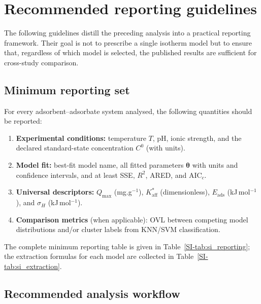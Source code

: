 \documentclass[journal=jacsat,manuscript=article]{achemso}
\begin{document}
	\section{Recommended reporting guidelines}
	\label{sec:guidelines}

	The following guidelines distill the preceding analysis into a practical reporting framework. Their goal is not to prescribe a single isotherm model but to ensure that, regardless of which model is selected, the published results are sufficient for cross-study comparison.

	\subsection{Minimum reporting set}
	\label{sec:min_reporting}

	For every adsorbent--adsorbate system analysed, the following quantities should be reported:
	\begin{enumerate}
		\item \textbf{Experimental conditions:} temperature $T$, pH, ionic strength, and the declared standard-state concentration $C^{0}$ (with units).
		\item \textbf{Model fit:} best-fit model name, all fitted parameters $\boldsymbol{\theta}$ with units and confidence intervals, and at least SSE, $R^2$, ARED, and AIC$_c$.
		\item \textbf{Universal descriptors:} $Q_{\max}$ (mg.g$^{-1}$), $K_{\mathrm{aff}}^{\ast}$ (dimensionless), $E_{\mathrm{ads}}$ (kJ\,mol$^{-1}$), and $\sigma_H$ (kJ\,mol$^{-1}$).
		\item \textbf{Comparison metrics} (when applicable): OVL between competing model distributions and/or cluster labels from KNN/SVM classification.
	\end{enumerate}
	The complete minimum reporting table is given in Table~\ref{SI-tab:si_reporting}; the extraction formulas for each model are collected in Table~\ref{SI-tab:si_extraction}.

	\subsection{Recommended analysis workflow}
	\label{sec:workflow}
\end{document}
